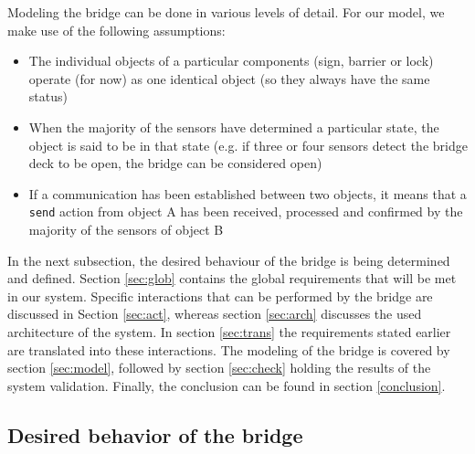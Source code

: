 Modeling the bridge can be done in various levels of detail. For our model, we make use of the following assumptions:
%
\begin{itemize}
	\item	The individual objects of a particular components (sign, barrier or lock) operate (for now) as one identical object (so they always have the same status)
	\item When the majority of the sensors have determined a particular state, the object is said to be in that state (e.g. if three or four sensors detect the bridge deck to be open, the bridge can be considered open)
	\item If a communication has been established between two objects, it means that a \texttt{send} action from object A has been received, processed and confirmed by the majority of the sensors of object B
\end{itemize}
%
In the next subsection, the desired behaviour of the bridge is being determined and defined. Section \ref{sec:glob} contains the global requirements that will be met in our system. Specific interactions that can be performed by the bridge are discussed in Section \ref{sec:act}, whereas section \ref{sec:arch} discusses the used architecture of the system. In section \ref{sec:trans} the requirements stated earlier are translated into these interactions. The modeling of the bridge is covered by section \ref{sec:model}, followed by section \ref{sec:check} holding the results of the system validation. Finally, the conclusion can be found in section \ref{conclusion}.

\subsection{Desired behavior of the bridge}

